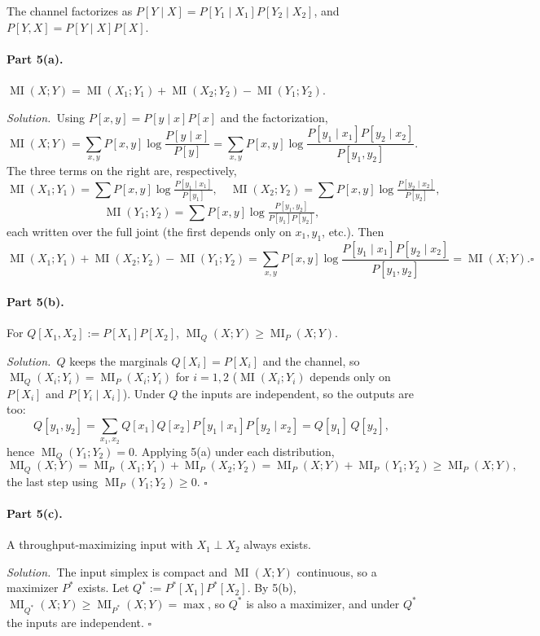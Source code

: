 \documentclass[11pt]{article}
\DeclareMathOperator{\MI}{MI}
\newcommand{\soln}{\medskip\noindent\textit{Solution.}\ }
\renewcommand{\qed}{\ensuremath{\square}}
\begin{document}
\begin{solution}
The channel factorizes as $P[Y\mid X]=P[Y_1\mid X_1]P[Y_2\mid X_2]$, and $P[Y,X]=P[Y\mid X]P[X]$.

\paragraph{Part 5(a).} $\MI(X;Y)=\MI(X_1;Y_1)+\MI(X_2;Y_2)-\MI(Y_1;Y_2)$.

\soln Using $P[x,y]=P[y\mid x]P[x]$ and the factorization,
\[
  \MI(X;Y)=\sum_{x,y}P[x,y]\log\frac{P[y\mid x]}{P[y]}
  =\sum_{x,y}P[x,y]\log\frac{P[y_1\mid x_1]P[y_2\mid x_2]}{P[y_1,y_2]}.
\]
The three terms on the right are, respectively,
\[
  \MI(X_1;Y_1)=\sum P[x,y]\log\tfrac{P[y_1\mid x_1]}{P[y_1]},\quad
  \MI(X_2;Y_2)=\sum P[x,y]\log\tfrac{P[y_2\mid x_2]}{P[y_2]},
\]
\[
  \MI(Y_1;Y_2)=\sum P[x,y]\log\tfrac{P[y_1,y_2]}{P[y_1]P[y_2]},
\]
each written over the full joint (the first depends only on $x_1,y_1$, etc.). Then
\[
  \MI(X_1;Y_1)+\MI(X_2;Y_2)-\MI(Y_1;Y_2)
  =\sum_{x,y}P[x,y]\log\frac{P[y_1\mid x_1]P[y_2\mid x_2]}{P[y_1,y_2]}=\MI(X;Y). \qed
\]

\paragraph{Part 5(b).} For $Q[X_1,X_2]:=P[X_1]P[X_2]$, $\MI_Q(X;Y)\ge\MI_P(X;Y)$.

\soln $Q$ keeps the marginals $Q[X_i]=P[X_i]$ and the channel, so $\MI_Q(X_i;Y_i)=\MI_P(X_i;Y_i)$ for $i=1,2$ ($\MI(X_i;Y_i)$ depends only on $P[X_i]$ and $P[Y_i\mid X_i]$). Under $Q$ the inputs are independent, so the outputs are too:
\[
  Q[y_1,y_2]=\sum_{x_1,x_2}Q[x_1]Q[x_2]P[y_1\mid x_1]P[y_2\mid x_2]=Q[y_1]\,Q[y_2],
\]
hence $\MI_Q(Y_1;Y_2)=0$. Applying 5(a) under each distribution,
\[
  \MI_Q(X;Y)=\MI_P(X_1;Y_1)+\MI_P(X_2;Y_2)
  =\MI_P(X;Y)+\MI_P(Y_1;Y_2)\ge\MI_P(X;Y),
\]
the last step using $\MI_P(Y_1;Y_2)\ge0$. \qed

\paragraph{Part 5(c).} A throughput-maximizing input with $X_1\perp X_2$ always exists.

\soln The input simplex is compact and $\MI(X;Y)$ continuous, so a maximizer $P^*$ exists. Let $Q^*:=P^*[X_1]P^*[X_2]$. By 5(b), $\MI_{Q^*}(X;Y)\ge\MI_{P^*}(X;Y)=\max$, so $Q^*$ is also a maximizer, and under $Q^*$ the inputs are independent. \qed
\end{solution}
\end{document}
